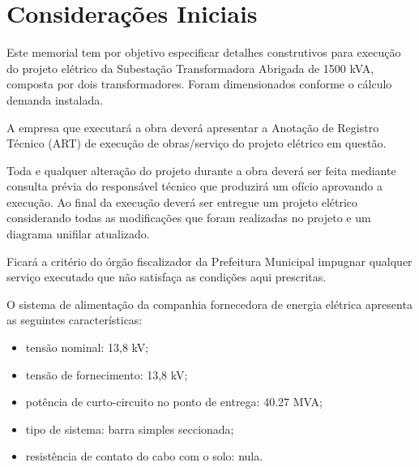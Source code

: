 \section{Considerações Iniciais}
Este memorial tem por objetivo especificar detalhes construtivos para execução do projeto
elétrico da Subestação Transformadora Abrigada de 1500 kVA, composta por dois transformadores. Foram
dimensionados conforme o cálculo demanda instalada.

A empresa que executará a obra deverá apresentar a Anotação de Registro Técnico (ART)
de execução de obras/serviço do projeto elétrico em questão.

Toda e qualquer alteração do projeto durante a obra deverá ser feita mediante consulta
prévia do responsável técnico que produzirá um ofício aprovando a execução. Ao final da
execução deverá ser entregue um projeto elétrico considerando todas
as modificações que foram realizadas no projeto e um diagrama unifilar atualizado.

Ficará a critério do órgão fiscalizador da Prefeitura Municipal impugnar qualquer serviço
executado que não satisfaça as condições aqui prescritas.

O sistema de alimentação da companhia fornecedora de energia elétrica apresenta as seguintes características:
\begin{itemize}
\item tensão nominal: 13,8 kV;
\item tensão de fornecimento: 13,8 kV;
\item potência de curto-circuito no ponto de entrega: 40.27 MVA;
\item tipo de sistema: barra simples seccionada;
\item resistência de contato do cabo com o solo: nula.
\end{itemize}